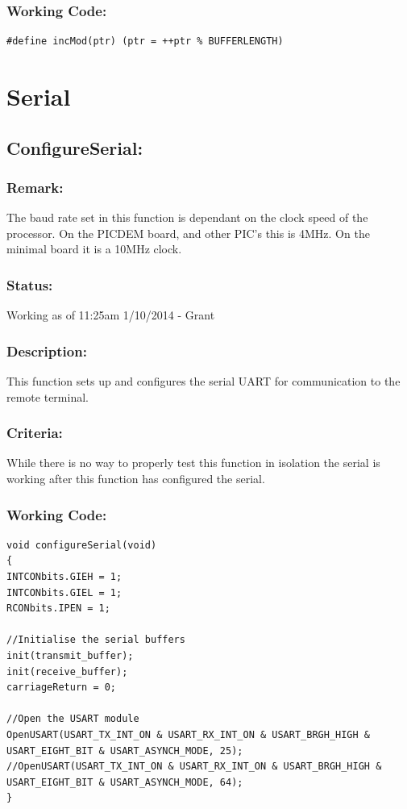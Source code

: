 \documentclass[]{report}
\begin{document}
\subsubsection{Working Code:}
\begin{lstlisting}
#define incMod(ptr) (ptr = ++ptr % BUFFERLENGTH)
\end{lstlisting}

\newpage
\section{Serial}


\subsection{ConfigureSerial:}
\subsubsection{Remark:}
The baud rate set in this function is dependant on the clock speed of the processor. On the PICDEM board, and other PIC's this is 4MHz. On the minimal board it is a 10MHz clock.

\subsubsection{Status:}
Working as of 11:25am 1/10/2014 - Grant

\subsubsection{Description:}
This function sets up and configures the serial UART for communication to the remote terminal.

\subsubsection{Criteria:}
While there is no way to properly test this function in isolation the serial is working after this function has configured the serial.

\subsubsection{Working Code:}
\begin{lstlisting}
void configureSerial(void)
{
INTCONbits.GIEH = 1;
INTCONbits.GIEL = 1;
RCONbits.IPEN = 1;

//Initialise the serial buffers
init(transmit_buffer);
init(receive_buffer);
carriageReturn = 0;

//Open the USART module
OpenUSART(USART_TX_INT_ON & USART_RX_INT_ON & USART_BRGH_HIGH & USART_EIGHT_BIT & USART_ASYNCH_MODE, 25);
//OpenUSART(USART_TX_INT_ON & USART_RX_INT_ON & USART_BRGH_HIGH & USART_EIGHT_BIT & USART_ASYNCH_MODE, 64);
}
\end{lstlisting}
\end{document}

